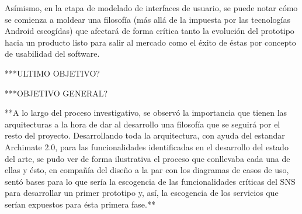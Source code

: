 Asímismo, en la etapa de modelado de interfaces de usuario, se puede notar cómo se comienza a moldear una filosofía (más allá de la impuesta por las tecnologías Android escogídas) que afectará de forma crítica tanto la evolución del prototipo hacia un producto listo para salir al mercado como el éxito de éstas por concepto de usabilidad del software.

***ULTIMO OBJETIVO?

***OBJETIVO GENERAL?

**A lo largo del proceso investigativo, se observó la importancia que tienen las arquitecturas a la hora de dar al desarrollo una filosofía que se seguirá por el resto del proyecto. Desarrollando toda la arquitectura, con ayuda del estandar Archimate 2.0, para las funcionalidades identificadas en el desarrollo del estado del arte, se pudo ver de forma ilustrativa el proceso que conllevaba cada una de ellas y ésto, en compañía del diseño a la par con los diagramas de casos de uso, sentó bases para lo que sería la escogencia de las funcionalidades críticas del SNS para desarrollar un primer prototipo y, así, la escogencia de los servicios que serían expuestos para ésta primera fase.**



